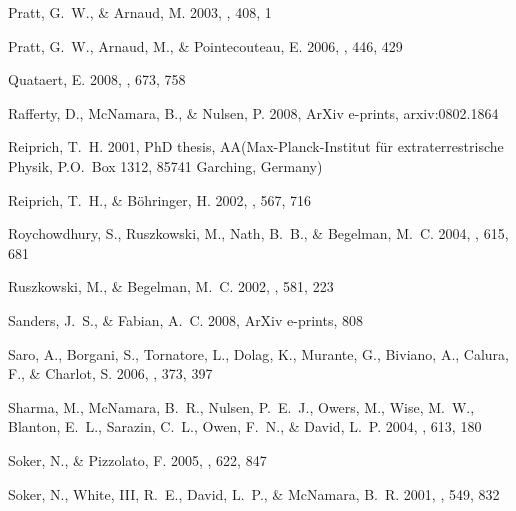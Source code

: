 \documentclass[12pt,preprint]{aastex}
\begin{document}
\begin{thebibliography}{137}
{Pratt}, G.~W., \& {Arnaud}, M. 2003, \aap, 408, 1

{Pratt}, G.~W., {Arnaud}, M., \& {Pointecouteau}, E. 2006, \aap, 446, 429

{Quataert}, E. 2008, \apj, 673, 758

{Rafferty}, D., {McNamara}, B., \& {Nulsen}, P. 2008, ArXiv e-prints,
  arxiv:0802.1864

{Reiprich}, T.~H. 2001, PhD thesis, AA(Max-Planck-Institut f{\"u}r
  extraterrestrische Physik, P.O.~Box 1312, 85741 Garching, Germany)

{Reiprich}, T.~H., \& {B{\"o}hringer}, H. 2002, \apj, 567, 716

{Roychowdhury}, S., {Ruszkowski}, M., {Nath}, B.~B., \& {Begelman}, M.~C. 2004,
  \apj, 615, 681

{Ruszkowski}, M., \& {Begelman}, M.~C. 2002, \apj, 581, 223

{Sanders}, J.~S., \& {Fabian}, A.~C. 2008, ArXiv e-prints, 808

{Saro}, A., {Borgani}, S., {Tornatore}, L., {Dolag}, K., {Murante}, G.,
  {Biviano}, A., {Calura}, F., \& {Charlot}, S. 2006, \mnras, 373, 397

{Sharma}, M., {McNamara}, B.~R., {Nulsen}, P.~E.~J., {Owers}, M., {Wise},
  M.~W., {Blanton}, E.~L., {Sarazin}, C.~L., {Owen}, F.~N., \& {David}, L.~P.
  2004, \apj, 613, 180

{Soker}, N., \& {Pizzolato}, F. 2005, \apj, 622, 847

{Soker}, N., {White}, III, R.~E., {David}, L.~P., \& {McNamara}, B.~R. 2001,
  \apj, 549, 832


\end{thebibliography}
\end{document}
